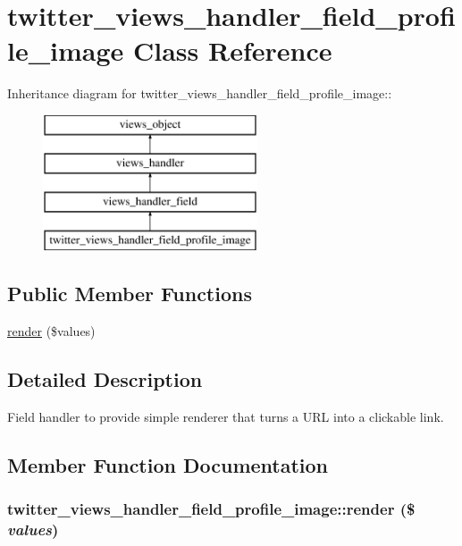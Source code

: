 \hypertarget{classtwitter__views__handler__field__profile__image}{
\section{twitter\_\-views\_\-handler\_\-field\_\-profile\_\-image Class Reference}
\label{classtwitter__views__handler__field__profile__image}
}
Inheritance diagram for twitter\_\-views\_\-handler\_\-field\_\-profile\_\-image::\begin{figure}[H]
\begin{center}
\leavevmode
\includegraphics[height=4cm]{classtwitter__views__handler__field__profile__image}
\end{center}
\end{figure}
\subsection*{Public Member Functions}
\begin{CompactItemize}
\item 
\hyperlink{classtwitter__views__handler__field__profile__image_f584af456dbbe206bdeea00682cebf3d}{render} (\$values)
\end{CompactItemize}


\subsection{Detailed Description}
Field handler to provide simple renderer that turns a URL into a clickable link. 

\subsection{Member Function Documentation}
\hypertarget{classtwitter__views__handler__field__profile__image_f584af456dbbe206bdeea00682cebf3d}{
\subsubsection[{render}]{\setlength{\rightskip}{0pt plus 5cm}twitter\_\-views\_\-handler\_\-field\_\-profile\_\-image::render (\$ {\em values})}}
\label{classtwitter__views__handler__field__profile__image_f584af456dbbe206bdeea00682cebf3d}


